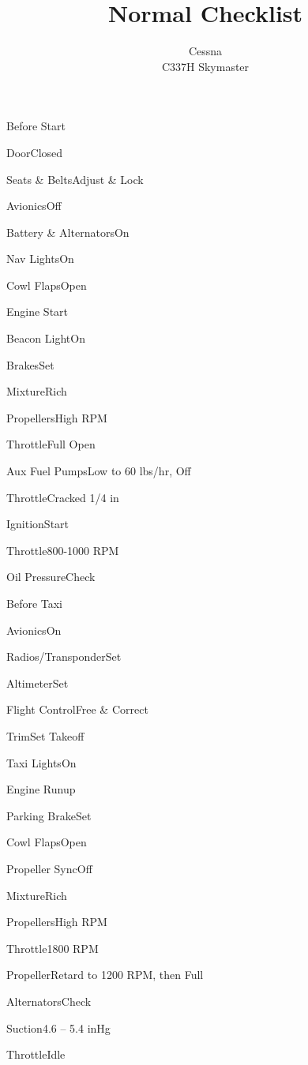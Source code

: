 \documentclass[sim-use, halfpage]{checklist}
\title{Normal Checklist}
\subtitle{Cessna \\ C337H Skymaster}
\begin{document}
  

\begin{checklist}{Before Start}
  \item{Door}{Closed}
  \item{Seats \& Belts}{Adjust \& Lock}
  \item{Avionics}{Off}
  \item{Battery \& Alternators}{On}
  \item{Nav Lights}{On}
  \item{Cowl Flaps}{Open}
\end{checklist}
  
\begin{checklist}{Engine Start}
  \item{Beacon Light}{On}
  \item{Brakes}{Set}
  \item{Mixture}{Rich}
  \item{Propellers}{High RPM}
  \item{Throttle}{Full Open}
  \item{Aux Fuel Pumps}{Low to 60 lbs/hr, Off}
  \item{Throttle}{Cracked 1/4 in}
  \item{Ignition}{Start}
  \item{Throttle}{800-1000 RPM}
  \item{Oil Pressure}{Check}
\end{checklist}

\begin{checklist}{Before Taxi}
  \item{Avionics}{On}
  \item{Radios/Transponder}{Set}
  \item{Altimeter}{Set}
  \item{Flight Control}{Free \& Correct}
  \item{Trim}{Set Takeoff}
  \item{Taxi Lights}{On}
\end{checklist}

\begin{checklist}{Engine Runup}
  \item{Parking Brake}{Set}
  \item{Cowl Flaps}{Open}
  \item{Propeller Sync}{Off}
  \item{Mixture}{Rich}
  \item{Propellers}{High RPM}
  \item{Throttle}{1800 RPM}
  \item{Propeller}{Retard to 1200 RPM, then Full}
  \item{Alternators}{Check}
  \item{Suction}{4.6 -- 5.4 inHg}
  \item{Throttle}{Idle}
\end{checklist}
\end{document}
